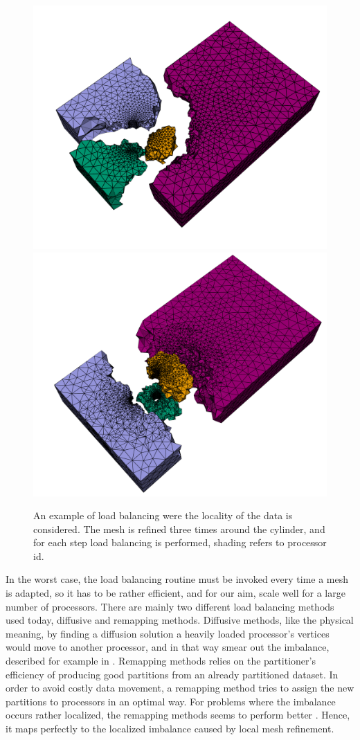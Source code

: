 \begin{figure}[bt]
\begin{center}
  \includegraphics[width=0.49\columnwidth]{chapters/hoffman-4/pdf/cr.pdf}
  \includegraphics[width=0.49\columnwidth]{chapters/hoffman-4/pdf/cr2.pdf}
\end{center}
\caption{An example of load balancing were the locality of the data is considered. The mesh is refined three times around the cylinder, and for each step load balancing is performed, shading refers to processor id.}
\end{figure}

In the worst case, the load balancing routine must be invoked every
time a mesh is adapted, so it has to be rather efficient, and for our
aim, scale well for a large number of processors. There are mainly two
different load balancing methods used today, diffusive and remapping
methods. Diffusive methods, like the physical meaning, by finding a
diffusion solution a heavily loaded processor's vertices would move to
another processor, and in that way smear out the imbalance, described
for example in \cite{HuBlake1995, SchloegelKarypisEtAl1997}. Remapping
methods relies on the partitioner's efficiency of producing good
partitions from an already partitioned dataset. In order to avoid
costly data movement, a remapping method tries to assign the new
partitions to processors in an optimal way. For problems where the
imbalance occurs rather localized, the remapping methods seems to
perform better \cite{SchloegelKarypisEtAl1998}. Hence, it maps
perfectly to the localized imbalance caused by local mesh refinement.

